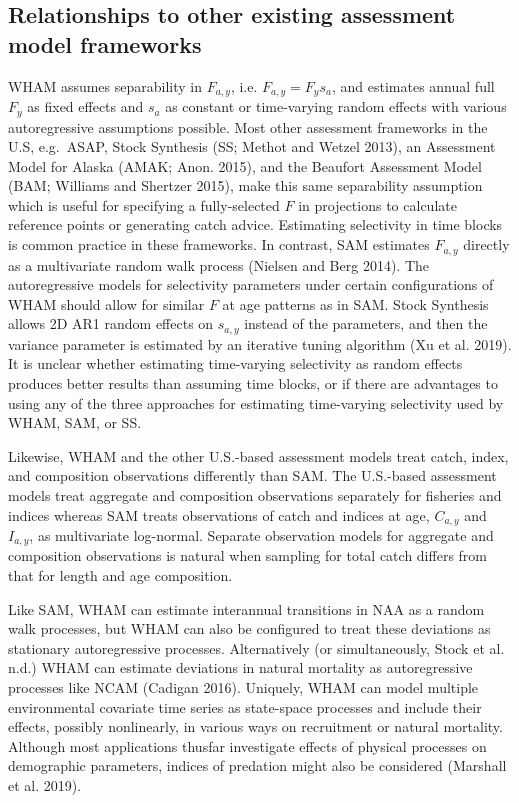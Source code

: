 \documentclass[]{article}
\begin{document}
\hypertarget{relationships-to-other-existing-assessment-model-frameworks}{%
\subsection{Relationships to other existing assessment model
frameworks}\label{relationships-to-other-existing-assessment-model-frameworks}}

WHAM assumes separability in \(F_{a,y}\), i.e. \(F_{a,y} = F_y s_a\),
and estimates annual full \(F_y\) as fixed effects and \(s_a\) as
constant or time-varying random effects with various autoregressive
assumptions possible. Most other assessment frameworks in the U.S,
e.g.~ASAP, Stock Synthesis (SS; Methot and Wetzel 2013), an Assessment
Model for Alaska (AMAK; Anon. 2015), and the Beaufort Assessment Model
(BAM; Williams and Shertzer 2015), make this same separability
assumption which is useful for specifying a fully-selected \(F\) in
projections to calculate reference points or generating catch advice.
Estimating selectivity in time blocks is common practice in these
frameworks. In contrast, SAM estimates \(F_{a,y}\) directly as a
multivariate random walk process (Nielsen and Berg 2014). The
autoregressive models for selectivity parameters under certain
configurations of WHAM should allow for similar \(F\) at age patterns as
in SAM. Stock Synthesis allows 2D AR1 random effects on \(s_{a,y}\)
instead of the parameters, and then the variance parameter is estimated
by an iterative tuning algorithm (Xu et al. 2019). It is unclear whether
estimating time-varying selectivity as random effects produces better
results than assuming time blocks, or if there are advantages to using
any of the three approaches for estimating time-varying selectivity used
by WHAM, SAM, or SS.

Likewise, WHAM and the other U.S.-based assessment models treat catch,
index, and composition observations differently than SAM. The U.S.-based
assessment models treat aggregate and composition observations
separately for fisheries and indices whereas SAM treats observations of
catch and indices at age, \(C_{a,y}\) and \(I_{a,y}\), as multivariate
log-normal. Separate observation models for aggregate and composition
observations is natural when sampling for total catch differs from that
for length and age composition.

Like SAM, WHAM can estimate interannual transitions in NAA as a random
walk processes, but WHAM can also be configured to treat these
deviations as stationary autoregressive processes. Alternatively (or
simultaneously, Stock et al. n.d.) WHAM can estimate deviations in
natural mortality as autoregressive processes like NCAM (Cadigan 2016).
Uniquely, WHAM can model multiple environmental covariate time series as
state-space processes and include their effects, possibly nonlinearly,
in various ways on recruitment or natural mortality. Although most
applications thusfar investigate effects of physical processes on
demographic parameters, indices of predation might also be considered
(Marshall et al. 2019).
\end{document}

